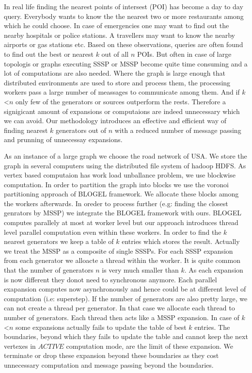 \documentclass{sig-alternate}
\begin{document}
In real life finding the nearest points of intersest (POI) has become a  day to day query. Everybody wants to know the the nearest two or more restaurants among which he could choose. In case of emergencies one may want to find out the nearby hospitals or police stations. A travellers may want to know the nearby airports or gas stations etc. Based on these observations, queries are often found to find out the best or nearest $k$ out of all $n$ POIs. But often in case of large topologis or graphs executing SSSP or MSSP become quite time consuming and a lot of computations are also needed.  Where the graph is large enough that distributed environments are used to store and process them, the processing workers pass a large number of meassages to communicate among them. And if $k$ \textless $n$ only few of the generators or sources outperform the rests. Therefore a signigicant amount of  expansions or computaions are indeed unnecessary which we can avoid. Our methodology introduces an effective and efficient way of finding nearest $k$ generators out of $n$ with a reduced number of message passing and prunning of unnecessay expansions.  

As an instance of a large graph we choose the road network of USA. We  store the graph in several computers using the distributed file system of hadoop HDFS. As vertex based computaion has work load unballance problem, we use blockwise computation. In order to partition the graph into blocks we use the voronoi partitioning approach of BLOGEL framework. We allocate these blocks among the workers afterwards. In oreder to process further (e.g: finding the closest genrators by MSSP) we integrate the BLOGEL framework with ours. BLOGEL computes parallely at most at worker level but our approach introduces thread level parallel computation even within these workers. In order to find the $k$ nearest generators we keep a table of $k$ entries which stores the result. Actually we treat the MSSP as a composite of single SSSPs. For each SSSP expansion from each generator we alloacte a thread within the worker. It is quite common that the number of generators $n$ is very much smaller than $k$. As each expansion is now different they donot need to synchronous anymore. Each parallel exapansion computes now asynchronously and hence could
be at different level of computation (i.e: superstep). If the number of generators are also pretty large, we can not create a thread per generator. In that case we allocate each thread to number of generators. Each thread then acts like a MSSP expansion. In case of $k$ \textless $n$ some expansions actually fails to update the table of best $k$ entries. The boundaries, beyond which they fails to update the table and cannot keep the next vertexes in $ACTIVE$ computation mode, are the limit of these expansion. We terminate or drop these expansion beyond these boundaries as they cost unnecessary computation and message passing beyond the boundaries.  
\end{document}
